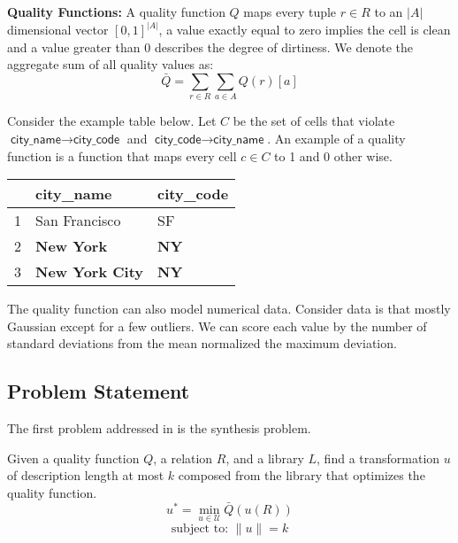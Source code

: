 \vspace{0.5em} \noindent \textbf{Quality Functions: } A quality function $Q$ maps every tuple $r \in R$ to an $|A|$ dimensional vector $[0,1]^{|A|}$, a value exactly equal to zero implies the cell is clean and a value greater than 0 describes the degree of dirtiness. We denote the aggregate sum of all quality values as: \[ \bar{Q} = \sum_{r \in R} \sum_{a \in A} Q(r)[a]\]

\begin{example}
Consider the example table below. Let $C$ be the set of cells that violate $\textsf{city\_name} \rightarrow \textsf{city\_code}$ and $\textsf{city\_code} \rightarrow \textsf{city\_name}$.
An example of a quality function is a function that maps every cell $c \in C$ to 1 and 0 other wise.
\end{example}

\begin{table}[ht!]
\centering
\label{my-label}
\begin{tabular}{|l|l|l|}
\hline
\rowcolor[HTML]{000000} 
& {\color[HTML]{FFFFFF} city\_name}            & {\color[HTML]{FFFFFF} city\_code}   \\ \hline
1 & San Francisco                                & SF                                  \\ \hline
2& {\color[HTML]{FE0000} \textbf{New York}}     & {\color[HTML]{FE0000} \textbf{NY}}                                  \\ \hline
3 & {\color[HTML]{FE0000} \textbf{New York City}}                              & {\color[HTML]{FE0000} \textbf{NY}} \\
\hline
\end{tabular}
\end{table}


\begin{example}
The quality function can also model numerical data. 
Consider data is that mostly Gaussian except for a few outliers. We can score each value by the number of standard deviations from the mean normalized the maximum deviation.
\end{example}

\subsection{Problem Statement}
The first problem addressed in \sys is the synthesis problem.

\begin{problem}[SYNTH(Q,R,L)]
Given a quality function $Q$, a relation $R$, and a library $L$, find a transformation $u$ of description length at most $k$ composed from the library that optimizes the quality function.
\[
u^* = \min_{u \in \mathcal{U}} \bar{Q}( u(R) )
\]
\[
\text{subject to: } \|u\| = k
\]
\end{problem}

